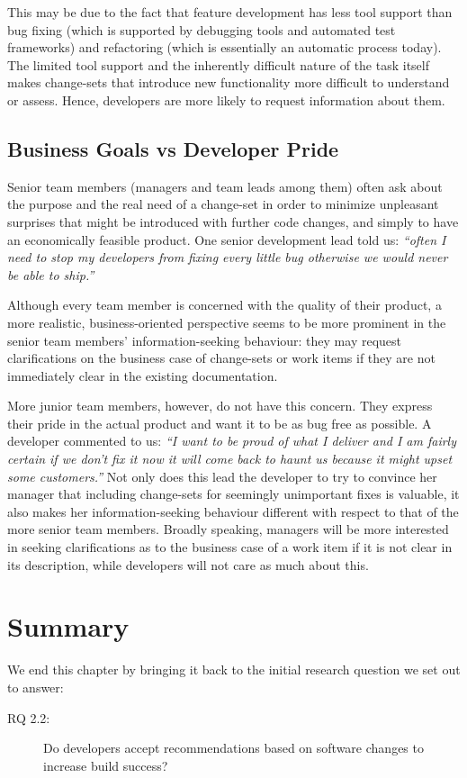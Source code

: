 This may be due to the fact that feature development has less tool support than bug fixing (which is supported by debugging tools and automated test frameworks) and refactoring (which is essentially an automatic process today). The limited tool support and the inherently difficult nature of the task itself makes change-sets that introduce new functionality more difficult to understand or assess. Hence, developers are more likely to request information about them.


\subsection{Business Goals vs Developer Pride}
Senior team members (managers and team leads among them) often ask about the purpose and the real need of a change-set in order to minimize unpleasant surprises that might be introduced with further code changes, and simply to have an economically feasible product. One senior development lead told us: \emph{``often I need to stop my developers from fixing every little bug otherwise we would never be able to ship.''}

Although every team member is concerned with the quality of their product, a more realistic, business-oriented perspective seems to be more prominent in the senior team members' information-seeking behaviour: they may request clarifications on the business case of change-sets or work items if they are not immediately clear in the existing documentation.

More junior team members, however, do not have this concern. They express their pride in the actual product and want it to be as bug free as possible. A developer commented to us: \emph{``I want to be proud of what I deliver and I am fairly certain if we don't fix it now it will come back to haunt us because it might upset some customers.''} Not only does this lead the developer to try to convince her manager that including change-sets for seemingly unimportant fixes is valuable, it also makes her information-seeking behaviour different with respect to that of the more senior team members. Broadly speaking, managers will be more interested in seeking clarifications as to the business case of a work item if it is not clear in its description, while developers will not care as much about this.


\section{Summary}
\label{sec:conclusions}
We end this chapter by bringing it back to the initial research question we set out to answer:
\begin{description}
  \item[RQ 2.2:] Do developers accept recommendations based on software changes to increase build success? 
\end{description}

